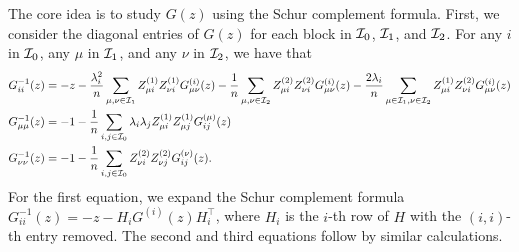 The core idea is to study $G(z)$ using the Schur complement formula.
First, we consider the diagonal entries of $G(z)$ for each block in $\cal I_0$, $\cal I_1$, and $\cal I_2$.
For any $i$ in $\cal I_0$, any $\mu$ in $\cal I_1$, and any $\nu$ in $\cal I_2$, we have that
\begin{align*}
	&G_{ii}^{-1}(z) = -z - \frac{\lambda_i^2}{n} \sum_{\mu,\nu\in \mathcal I_1} Z^{(1)}_{\mu i}Z^{(1)}_{\nu i}G^{\left( i \right)}_{\mu\nu}(z) - \frac{1}{n} \sum_{\mu,\nu\in \mathcal I_2} Z^{(2)}_{\mu i}Z^{(2)}_{\nu i} G^{\left( i \right)}_{\mu\nu}(z) -\frac{2\lambda_i}{n} \sum_{\mu\in \cal I_1,\nu\in \mathcal I_2} Z^{(1)}_{\mu i}Z^{(2)}_{\nu i}G^{\left( i \right)}_{\mu\nu}(z) \\
	&G_{\mu\mu}^{-1}(z) =  - 1 - \frac{1}{n} \sum_{i,j\in \mathcal I_0}\lambda_i \lambda_j Z^{(1)}_{\mu i}Z^{(1)}_{\mu j} G^{\left(\mu\right)}_{ij}(z) \\
	&G_{\nu\nu}^{-1}(z) =  - 1 - \frac{1}{n} \sum_{i,j\in \mathcal I_0}  Z^{(2)}_{\nu i}Z^{(2)}_{\nu j}  G^{\left(\nu\right)}_{ij}(z).
\end{align*}
For the first equation, we expand the Schur complement formula $G_{ii}^{-1}(z) = -z - H_i G^{(i)}(z) H_{i}^\top$, where $H_i$ is the $i$-th row of $H$ with the $(i,i)$-th entry removed.
The second and third equations follow by similar calculations.


